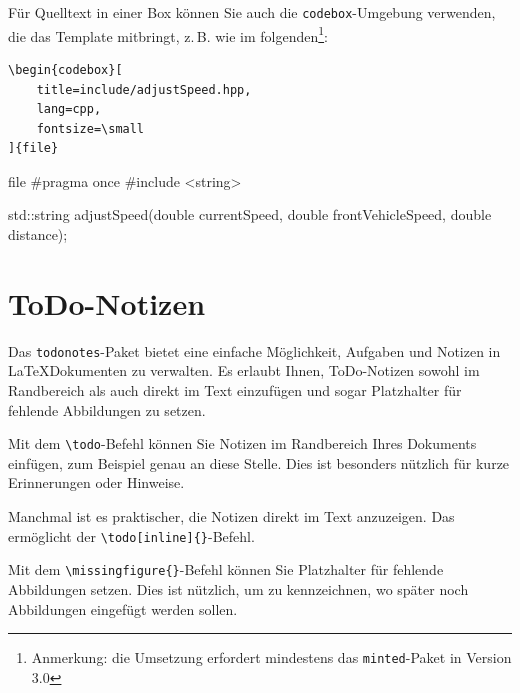 Für Quelltext in einer Box können Sie auch die \texttt{codebox}-Umgebung
verwenden, die das Template mitbringt, z.\,B. wie im
folgenden\footnote{Anmerkung: die Umsetzung erfordert mindestens das
\texttt{minted}-Paket in Version 3.0}:

\begin{verbatim}
\begin{codebox}[
    title=include/adjustSpeed.hpp,
    lang=cpp,
    fontsize=\small
]{file}
\end{verbatim}

\begin{codebox}[title=include/adjustSpeed.hpp, lang=cpp, font=\small]{file}
#pragma once
#include <string>

std::string adjustSpeed(double currentSpeed,
                        double frontVehicleSpeed,
                        double distance);
\end{codebox}



\section{ToDo-Notizen}

Das \texttt{todonotes}-Paket bietet eine einfache Möglichkeit, Aufgaben und
Notizen in \LaTeX\-Dokumenten zu verwalten. Es erlaubt Ihnen, ToDo-Notizen
sowohl im Randbereich als auch direkt im Text einzufügen und sogar Platzhalter
für fehlende Abbildungen zu setzen.

Mit dem \texttt{\textbackslash todo}-Befehl können Sie Notizen im Randbereich
Ihres Dokuments einfügen, zum Beispiel genau an diese Stelle. Dies ist besonders nützlich für kurze Erinnerungen oder
Hinweise.

Manchmal ist es praktischer, die Notizen direkt im Text anzuzeigen. Das
ermöglicht der \texttt{\textbackslash todo[inline]\{\}}-Befehl.


Mit dem \texttt{\textbackslash missingfigure\{\}}-Befehl können Sie Platzhalter
für fehlende Abbildungen setzen. Dies ist nützlich, um zu kennzeichnen, wo
später noch Abbildungen eingefügt werden sollen.

